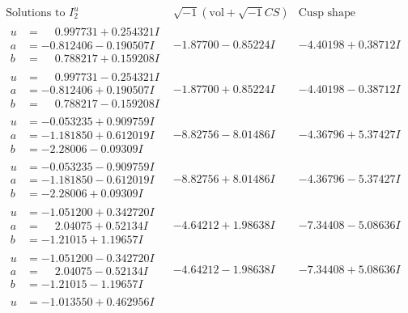 \documentclass[1p]{elsarticle_modified}
\theoremstyle{definition}
\newcommand{\I}{\sqrt{-1}}
\begin{document}
$$\begin{array}{c|c|c}  
\text{Solutions to }I^u_{2}& \I (\text{vol} + \sqrt{-1}CS) & \text{Cusp shape}\\
 \hline 
\begin{aligned}
u &= \phantom{-}0.997731 + 0.254321 I \\
a &= -0.812406 - 0.190507 I \\
b &= \phantom{-}0.788217 + 0.159208 I\end{aligned}
 & -1.87700 - 0.85224 I & -4.40198 + 0.38712 I \\ \hline\begin{aligned}
u &= \phantom{-}0.997731 - 0.254321 I \\
a &= -0.812406 + 0.190507 I \\
b &= \phantom{-}0.788217 - 0.159208 I\end{aligned}
 & -1.87700 + 0.85224 I & -4.40198 - 0.38712 I \\ \hline\begin{aligned}
u &= -0.053235 + 0.909759 I \\
a &= -1.181850 + 0.612019 I \\
b &= -2.28006 - 0.09309 I\end{aligned}
 & -8.82756 - 8.01486 I & -4.36796 + 5.37427 I \\ \hline\begin{aligned}
u &= -0.053235 - 0.909759 I \\
a &= -1.181850 - 0.612019 I \\
b &= -2.28006 + 0.09309 I\end{aligned}
 & -8.82756 + 8.01486 I & -4.36796 - 5.37427 I \\ \hline\begin{aligned}
u &= -1.051200 + 0.342720 I \\
a &= \phantom{-}2.04075 + 0.52134 I \\
b &= -1.21015 + 1.19657 I\end{aligned}
 & -4.64212 + 1.98638 I & -7.34408 - 5.08636 I \\ \hline\begin{aligned}
u &= -1.051200 - 0.342720 I \\
a &= \phantom{-}2.04075 - 0.52134 I \\
b &= -1.21015 - 1.19657 I\end{aligned}
 & -4.64212 - 1.98638 I & -7.34408 + 5.08636 I \\ \hline\begin{aligned}
u &= -1.013550 + 0.462956 I \\

\end{aligned}
\end{array}$$
\end{document}
